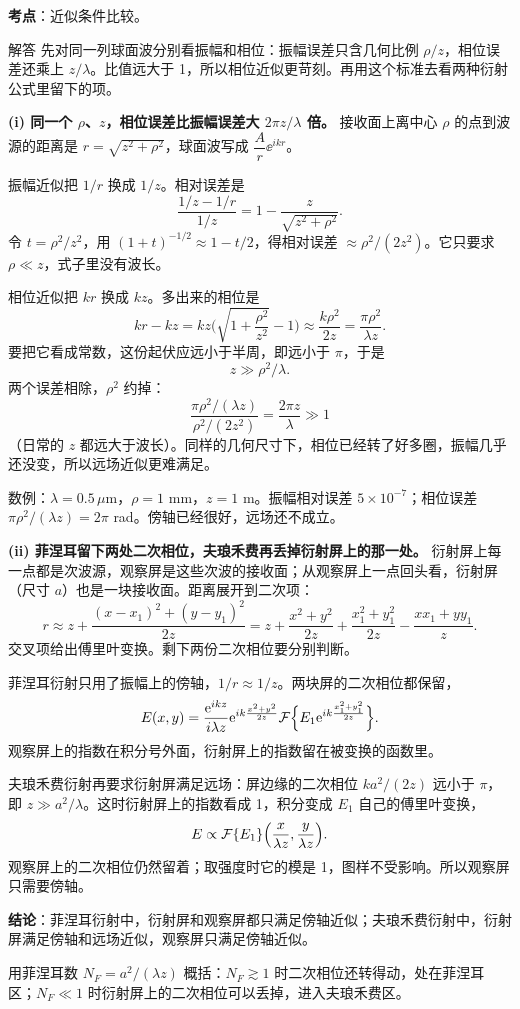 \textbf{考点}：\pageref{box:approx}近似条件比较。

\begin{exam}{解答}
先对同一列球面波分别看振幅和相位：振幅误差只含几何比例 $\rho/z$，相位误差还乘上 $z/\lambda$。比值远大于 1，所以相位近似更苛刻。再用这个标准去看两种衍射公式里留下的项。

\textbf{(i) 同一个 $\rho$、$z$，相位误差比振幅误差大 $2\pi z/\lambda$ 倍。}
接收面上离中心 $\rho$ 的点到波源的距离是 $r=\sqrt{z^2+\rho^2}$，球面波写成 $\dfrac{A}{r}\ee^{ikr}$。

振幅近似把 $1/r$ 换成 $1/z$。相对误差是
\[
\frac{1/z-1/r}{1/z}=1-\frac{z}{\sqrt{z^2+\rho^2}} .
\]
令 $t=\rho^2/z^2$，用 $(1+t)^{-1/2}\approx1-t/2$，得相对误差 $\approx\rho^2/(2z^2)$。它只要求 $\rho\ll z$，式子里没有波长。

相位近似把 $kr$ 换成 $kz$。多出来的相位是
\[
kr-kz=kz\Big(\sqrt{1+\frac{\rho^2}{z^2}}-1\Big)\approx\frac{k\rho^2}{2z}=\frac{\pi\rho^2}{\lambda z} .
\]
要把它看成常数，这份起伏应远小于半周，即远小于 $\pi$，于是
\[
\boxed{z\gg\rho^2/\lambda} .
\]
两个误差相除，$\rho^2$ 约掉：
\[
\frac{\pi\rho^2/(\lambda z)}{\rho^2/(2z^2)}=\frac{2\pi z}{\lambda}\gg1
\]
（日常的 $z$ 都远大于波长）。同样的几何尺寸下，相位已经转了好多圈，振幅几乎还没变，所以远场近似更难满足。

数例：$\lambda=0.5\,\mu$m，$\rho=1$ mm，$z=1$ m。振幅相对误差 $5\times10^{-7}$；相位误差 $\pi\rho^2/(\lambda z)=2\pi$ rad。傍轴已经很好，远场还不成立。

\textbf{(ii) 菲涅耳留下两处二次相位，夫琅禾费再丢掉衍射屏上的那一处。}
衍射屏上每一点都是次波源，观察屏是这些次波的接收面；从观察屏上一点回头看，衍射屏（尺寸 $a$）也是一块接收面。距离展开到二次项：
\[
r\approx z+\frac{(x-x_1)^2+(y-y_1)^2}{2z}
=z+\frac{x^2+y^2}{2z}+\frac{x_1^2+y_1^2}{2z}-\frac{xx_1+yy_1}{z} .
\]
交叉项给出傅里叶变换。剩下两份二次相位要分别判断。

菲涅耳衍射只用了振幅上的傍轴，$1/r\approx1/z$。两块屏的二次相位都保留，
\[
E(x,y)=\frac{\mathrm{e}^{ikz}}{i\lambda z}\mathrm{e}^{ik\frac{x^2+y^2}{2z}}
\mathcal{F}\Big\{E_1\mathrm{e}^{ik\frac{x_1^2+y_1^2}{2z}}\Big\} .
\]
观察屏上的指数在积分号外面，衍射屏上的指数留在被变换的函数里。

夫琅禾费衍射再要求衍射屏满足远场：屏边缘的二次相位 $ka^2/(2z)$ 远小于 $\pi$，即 $z\gg a^2/\lambda$。这时衍射屏上的指数看成 1，积分变成 $E_1$ 自己的傅里叶变换，
\[
E\propto\mathcal{F}\{E_1\}\Big(\frac{x}{\lambda z},\frac{y}{\lambda z}\Big) .
\]
观察屏上的二次相位仍然留着；取强度时它的模是 1，图样不受影响。所以观察屏只需要傍轴。

\textbf{结论}：菲涅耳衍射中，衍射屏和观察屏都只满足傍轴近似；夫琅禾费衍射中，衍射屏满足傍轴和远场近似，观察屏只满足傍轴近似。

用菲涅耳数 $N_F=a^2/(\lambda z)$ 概括：$N_F\gtrsim1$ 时二次相位还转得动，处在菲涅耳区；$N_F\ll1$ 时衍射屏上的二次相位可以丢掉，进入夫琅禾费区。
\end{exam}

